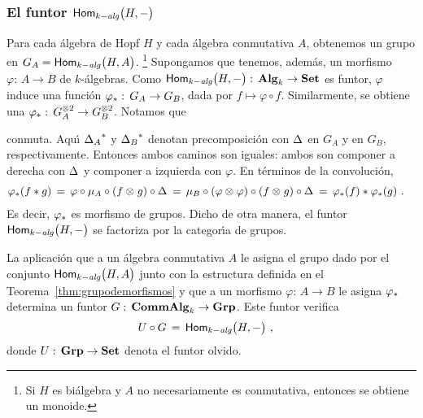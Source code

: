 \subsubsection{El funtor $\Homalg\big(H,-\big)$}
Para cada \'{a}lgebra de Hopf $H$ y cada \'{a}lgebra conmutativa $A$,
obtenemos un grupo en $G_A=\Homalg\big(H,A\big)$.%
\footnote{
	Si $H$ es bi\'{a}lgebra y $A$ no necesariamente es conmutativa,
	entonces se obtiene un monoide.
}
Supongamos que tenemos, adem\'{a}s, un morfismo $\varphi:\,A\rightarrow B$ de
$k$-\'{a}lgebras. Como $\Homalg\big(H,-\big):\,\Alg[k]\rightarrow\Set$ es
funtor, $\varphi$ induce una funci\'{o}n $\push\varphi:\,G_A\rightarrow G_B$,
dada por $f\mapsto \varphi\circ f$. Similarmente, se obtiene una
$\push\varphi:\,G_A^{\otimes 2}\rightarrow G_B^{\otimes 2}$. Notamos que
\begin{center}
\end{center}
conmuta. Aqu\'{\i} $\pull{\coproducto[A]}$ y $\pull{\coproducto[B]}$ denotan
precomposici\'{o}n con $\coproducto$ en $G_A$ y en $G_B$, respectivamente.
Entonces ambos caminos son iguales: ambos son componer a derecha con
$\coproducto$ y componer a izquierda con $\varphi$. En t\'{e}rminos de la
convoluci\'{o}n,
\begin{align*}
	\push\varphi(f\convol g) & \,=\,
		\varphi\circ\producto[A]\circ(f\tensor g)\circ\coproducto
		\,=\,\producto[B]\circ(\varphi\tensor\varphi)\circ
			(f\tensor g)\circ\coproducto
		\,=\,\push\varphi(f)\convol\push\varphi(g)
	\text{ .}
\end{align*}
%
Es decir, $\push\varphi$ es morfismo de grupos. Dicho de otra manera, el funtor
$\Homalg\big(H,-\big)$ se factoriza por la categor\'{\i}a de grupos.

\begin{coroGrupoDeMorfismos}\label{coro:grupodemorfismos}
	La aplicaci\'{o}n que a un \'{a}lgebra conmutativa $A$ le asigna el
	grupo dado por el conjunto $\Homalg\big(H,A\big)$ junto con la
	estructura definida en el Teorema~\ref{thm:grupodemorfismos} y que a un
	morfismo $\varphi:\,A\rightarrow B$ le asigna $\push\varphi$ determina
	un funtor $G:\,\CommAlg[k]\rightarrow\Grp$. Este funtor verifica
	\begin{align*}
		U\circ G & \,=\,\Homalg\big(H,-\big)
		\text{ ,}
	\end{align*}
	donde $U:\,\Grp\rightarrow\Set$ denota el funtor olvido.
\end{coroGrupoDeMorfismos}

